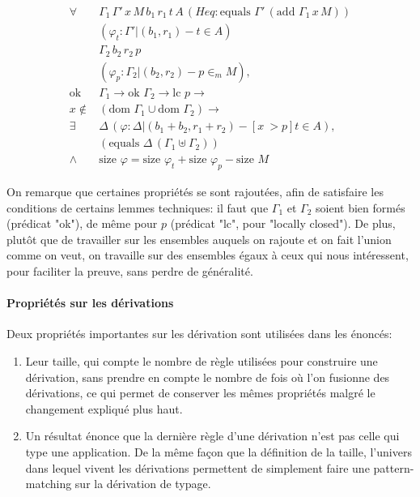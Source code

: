 \documentclass[10pt]{article}
\begin{document}
\begin{align*}
  \forall \quad& \Gamma_1 \, \Gamma' \, x \, M \, b_1 \, r_1 \, t \, A \, (Heq : \text{equals } \Gamma' \, (\text{add } \Gamma_1 \, x \, M)) \\
  & (\varphi_t : \Gamma' |(b_1, r_1)- t \in A) \\
  & \Gamma_2 \, b_2 \, r_2 \, p \\
  & (\varphi_p : \Gamma_2 |(b_2, r_2)- p \in_m M), \\
  \text{ok } & \Gamma_1 \rightarrow \text{ok } \Gamma_2 \rightarrow \text{lc } p \rightarrow \\
  x \notin & (\text{dom } \Gamma_1 \cup \text{dom } \Gamma_2) \rightarrow \\
  \exists \quad &\Delta \, (\varphi : \Delta |(b_1 + b_2, r_1 + r_2)- [x ~> p]t \in A), \\
      &(\text{equals } \Delta \, (\Gamma_1 \uplus \Gamma_2)) \\ 
  \land \, & \text{size } \varphi = \text{size } \varphi_t + \text{size } \varphi_p - \text{size } M
\end{align*}

On remarque que certaines propriétés se sont rajoutées, afin de satisfaire les conditions de certains lemmes techniques: il faut que $\Gamma_1$ et $\Gamma_2$ soient bien formés (prédicat "ok"), de même pour $p$ (prédicat "lc", pour "locally closed"). De plus, plutôt que de travailler sur les ensembles auquels on rajoute et on fait l'union comme on veut, on travaille sur des ensembles égaux à ceux qui nous intéressent, pour faciliter la preuve, sans perdre de généralité.


\paragraph{Propriétés sur les dérivations} Deux propriétés importantes sur les dérivation sont utilisées dans les énoncés:
\begin{enumerate}
  \item Leur taille, qui compte le nombre de règle utilisées pour construire une dérivation, sans prendre en compte le nombre de fois où l'on fusionne des dérivations, ce qui permet de conserver les mêmes propriétés malgré le changement expliqué plus haut.
  \item Un résultat énonce que la dernière règle d'une dérivation n'est pas celle qui type une application. De la même façon que la définition de la taille, l'univers dans lequel vivent les dérivations permettent de simplement faire une pattern-matching sur la dérivation de typage.
\end{enumerate}
\end{document}
